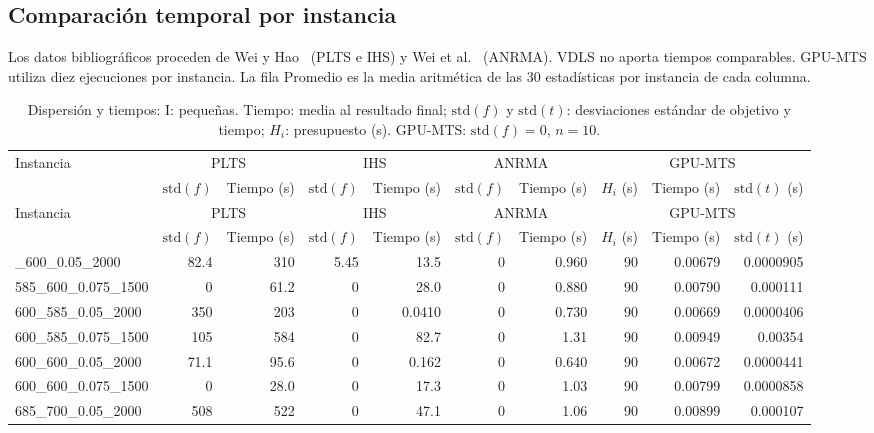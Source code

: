 \begin{landscape}
\section{{Comparación temporal por instancia}}
\label{app:full-times}
{Los datos bibliográficos proceden de Wei y Hao~\cite{Wei2023IHS} (PLTS e IHS) y Wei et al.~\cite{Wei2026ANRMA} (ANRMA). VDLS no aporta tiempos comparables. GPU-MTS utiliza diez ejecuciones por instancia. La fila Promedio es la media aritmética de las 30 estadísticas por instancia de cada columna.}

\footnotesize\setlength{\tabcolsep}{4pt}\renewcommand{\arraystretch}{.88}
\begin{longtable}{lrrrrrrrrr}
\caption{Dispersión y tiempos: I: pequeñas. Tiempo: media al resultado final; $\mathrm{std}(f)$ y $\mathrm{std}(t)$: desviaciones estándar de objetivo y tiempo; $H_i$: presupuesto (s). GPU-MTS: $\mathrm{std}(f)=0$, $n=10$.}\\
\toprule
Instancia & \multicolumn{2}{c}{PLTS} & \multicolumn{2}{c}{IHS} & \multicolumn{2}{c}{ANRMA} & \multicolumn{3}{c}{GPU-MTS}\\
 & $\mathrm{std}(f)$ & Tiempo (s) & $\mathrm{std}(f)$ & Tiempo (s) & $\mathrm{std}(f)$ & Tiempo (s) & $H_i$ (s) & Tiempo (s) & $\mathrm{std}(t)$ (s)\\
\midrule\endfirsthead
Instancia & \multicolumn{2}{c}{PLTS} & \multicolumn{2}{c}{IHS} & \multicolumn{2}{c}{ANRMA} & \multicolumn{3}{c}{GPU-MTS}\\
 & $\mathrm{std}(f)$ & Tiempo (s) & $\mathrm{std}(f)$ & Tiempo (s) & $\mathrm{std}(f)$ & Tiempo (s) & $H_i$ (s) & Tiempo (s) & $\mathrm{std}(t)$ (s)\\
\midrule\endhead
\bottomrule\endlastfoot
585\_600\_0.05\_2000 & 82.4 & 310 & 5.45 & 13.5 & 0 & 0.960 & 90 & 0.00679 & 0.0000905\\
585\_600\_0.075\_1500 & 0 & 61.2 & 0 & 28.0 & 0 & 0.880 & 90 & 0.00790 & 0.000111\\
600\_585\_0.05\_2000 & 350 & 203 & 0 & 0.0410 & 0 & 0.730 & 90 & 0.00669 & 0.0000406\\
600\_585\_0.075\_1500 & 105 & 584 & 0 & 82.7 & 0 & 1.31 & 90 & 0.00949 & 0.00354\\
600\_600\_0.05\_2000 & 71.1 & 95.6 & 0 & 0.162 & 0 & 0.640 & 90 & 0.00672 & 0.0000441\\
600\_600\_0.075\_1500 & 0 & 28.0 & 0 & 17.3 & 0 & 1.03 & 90 & 0.00799 & 0.0000858\\
685\_700\_0.05\_2000 & 508 & 522 & 0 & 47.1 & 0 & 1.06 & 90 & 0.00899 & 0.000107\\

\end{longtable}
\end{landscape}
